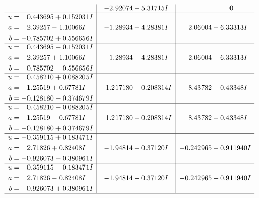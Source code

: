 \documentclass[1p]{elsarticle_modified}
\theoremstyle{definition}
\begin{document}
$$\begin{array}{c|c|c}
 & -2.92074 - 5.31715 I & \phantom{-0.000000 } 0 \\ \hline\begin{aligned}
u &= \phantom{-}0.443695 + 0.152031 I \\
a &= \phantom{-}2.39257 - 1.10066 I \\
b &= -0.785702 + 0.556656 I\end{aligned}
 & -1.28934 + 4.28381 I & \phantom{-}2.06004 - 6.33313 I \\ \hline\begin{aligned}
u &= \phantom{-}0.443695 - 0.152031 I \\
a &= \phantom{-}2.39257 + 1.10066 I \\
b &= -0.785702 - 0.556656 I\end{aligned}
 & -1.28934 - 4.28381 I & \phantom{-}2.06004 + 6.33313 I \\ \hline\begin{aligned}
u &= \phantom{-}0.458210 + 0.088205 I \\
a &= \phantom{-}1.25519 + 0.67781 I \\
b &= -0.128180 - 0.374679 I\end{aligned}
 & \phantom{-}1.217180 + 0.208314 I & \phantom{-}8.43782 - 0.43348 I \\ \hline\begin{aligned}
u &= \phantom{-}0.458210 - 0.088205 I \\
a &= \phantom{-}1.25519 - 0.67781 I \\
b &= -0.128180 + 0.374679 I\end{aligned}
 & \phantom{-}1.217180 - 0.208314 I & \phantom{-}8.43782 + 0.43348 I \\ \hline\begin{aligned}
u &= -0.359115 + 0.183471 I \\
a &= \phantom{-}2.71826 + 0.82408 I \\
b &= -0.926073 - 0.380961 I\end{aligned}
 & -1.94814 + 0.37120 I & -0.242965 - 0.911940 I \\ \hline\begin{aligned}
u &= -0.359115 - 0.183471 I \\
a &= \phantom{-}2.71826 - 0.82408 I \\
b &= -0.926073 + 0.380961 I\end{aligned}
 & -1.94814 - 0.37120 I & -0.242965 + 0.911940 I\\
 \hline 
 \end{array}$$\newpage$$\begin{array}{c|c|c}  

\end{array}$$
\end{document}
